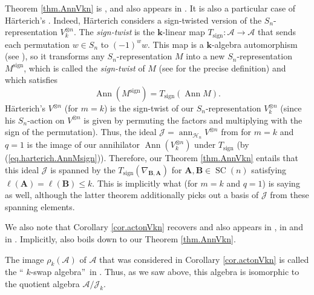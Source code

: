 \documentclass[numbers=enddot,12pt,final,onecolumn,notitlepage]{scrartcl}%
\numberwithin{exer}{subsection}
\theoremstyle{definition}
\begin{document}
Theorem \ref{thm.AnnVkn} is \cite[Theorem 4.2]{deCPro76}, and also appears in
\cite[Example 2.11]{Donkin24}. It is also a particular case of H\"{a}rterich's
\cite[\S 3]{Harter99}. Indeed, H\"{a}rterich considers a sign-twisted version
of the $S_{n}$-representation $V_{k}^{\otimes n}$. The \emph{sign-twist} is
the $\mathbf{k}$-linear map $T_{\operatorname*{sign}}:\mathcal{A}%
\rightarrow\mathcal{A}$ that sends each permutation $w\in S_{n}$ to $\left(
-1\right)  ^{w}w$. This map is a $\mathbf{k}$-algebra automorphism (see
\cite[Theorem 3.11.5]{sga}), so it transforms any $S_{n}$-representation $M$
into a new $S_{n}$-representation $M^{\operatorname*{sign}}$, which is called
the \emph{sign-twist} of $M$ (see \cite[Definition 5.18.2]{sga} for the
precise definition) and which satisfies
\begin{equation}
\operatorname*{Ann}\left(  M^{\operatorname*{sign}}\right)
=T_{\operatorname*{sign}}\left(  \operatorname*{Ann}M\right)  .
\label{eq.harterich.AnnMsign}%
\end{equation}
H\"{a}rterich's $V^{\otimes n}$ (for $m=k$) is the sign-twist of our $S_{n}%
$-representation $V_{k}^{\otimes n}$ (since his $S_{n}$-action on $V^{\otimes
n}$ is given by permuting the factors and multiplying with the sign of the
permutation). Thus, the ideal $\mathcal{J}=\operatorname*{ann}%
\nolimits_{\mathcal{H}_{n}}V^{\otimes n}$ from \cite[\S 3]{Harter99} for $m=k$
and $q=1$ is the image of our annihilator $\operatorname*{Ann}\left(
V_{k}^{\otimes n}\right)  $ under $T_{\operatorname*{sign}}$ (by
(\ref{eq.harterich.AnnMsign})). Therefore, our Theorem \ref{thm.AnnVkn}
entails that this ideal $\mathcal{J}$ is spanned by the
$T_{\operatorname*{sign}}\left(  \nabla_{\mathbf{B},\mathbf{A}}\right)  $ for
$\mathbf{A},\mathbf{B}\in\operatorname*{SC}\left(  n\right)  $ satisfying
$\ell\left(  \mathbf{A}\right)  =\ell\left(  \mathbf{B}\right)  \leq k$. This
is implicitly what \cite[\S 3]{Harter99} (for $m=k$ and $q=1$) is saying as
well, although the latter theorem additionally picks out a basis of
$\mathcal{J}$ from these spanning elements.

We also note that Corollary \ref{cor.actonVkn} recovers \cite[Theorem
3.3]{Proces21} and also appears in \cite[Corollary 1.4 (i)]{BoDoMa22}, in
\cite[Example 2.11]{Donkin24} and in \cite[Theorem 1]{RaSaSu12}. Implicitly,
\cite[Lemma 8.1 and the remark after it]{BaiRai} also boils down to our
Theorem \ref{thm.AnnVkn}.

The image $\rho_{k}\left(  \mathcal{A}\right)  $ of $\mathcal{A}$ that was
considered in Corollary \ref{cor.actonVkn} is called the \textquotedblleft%
$k$-swap algebra\textquotedblright\ in \cite[\S 1.3]{KlStVo25}. Thus, as we
saw above, this algebra is isomorphic to the quotient algebra $\mathcal{A}%
/\mathcal{J}_{k}$.
\end{document}
